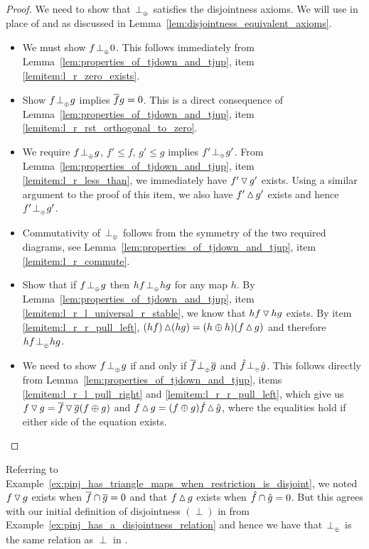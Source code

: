 \begin{proof}
  We need to show that ${}_{{}_{}}{\perp_{{}_{\oplus}}}$ satisfies the disjointness axioms. We will use  in
  place of  and  as discussed in
  Lemma~\ref{lem:disjointness_equivalent_axioms}.
  \begin{itemize}
    \item[\axiom{Dis}{1}] We must show $f {}_{{}_{}}{\perp_{{}_{\oplus}}} 0$. This follows immediately from
      Lemma~\ref{lem:properties_of_tjdown_and_tjup}, item \ref{lemitem:l_r_zero_exists}.
    \item[\axiom{Dis}{2}] Show $f {}_{{}_{}}{\perp_{{}_{\oplus}}} g$ implies $\overline{f}g = 0$. This is a direct consequence of
      Lemma~\ref{lem:properties_of_tjdown_and_tjup}, item
      \ref{lemitem:l_r_rst_orthogonal_to_zero}.
    \item[\axiom{Dis}{3}] We require $f{}_{{}_{}}{\perp_{{}_{\oplus}}} g$, $f' \le f$, $g' \le g$ implies $f' {}_{{}_{}}{\perp_{{}_{\oplus}}} g'$.
      From Lemma~\ref{lem:properties_of_tjdown_and_tjup}, item \ref{lemitem:l_r_less_than}, we
      immediately have $f' \operatorname{\triangledown} g'$ exists. Using a similar argument to the proof of this item,
      we also have $f' \operatorname{\vartriangle} g'$ exists and hence $f' {}_{{}_{}}{\perp_{{}_{\oplus}}} g'$.
    \item[\axiom{Dis}{4}] Commutativity of ${}_{{}_{}}{\perp_{{}_{\oplus}}}$ follows from the symmetry of the two required
    diagrams, see Lemma~\ref{lem:properties_of_tjdown_and_tjup}, item
      \ref{lemitem:l_r_commute}.
    \item[\axiom{Dis}{5}] Show that if $f{}_{{}_{}}{\perp_{{}_{\oplus}}} g$ then $h f {}_{{}_{}}{\perp_{{}_{\oplus}}} h g$ for any map $h$.
      By  Lemma~\ref{lem:properties_of_tjdown_and_tjup}, item
      \ref{lemitem:l_r_l_universal_r_stable}, we know that $h f \operatorname{\triangledown} h g$ exists.
      By item \ref{lemitem:l_r_r_pull_left},  $(h f)\operatorname{\vartriangle} (h g) = (h \oplus h) (f\operatorname{\vartriangle} g)$
      and therefore $h f {}_{{}_{}}{\perp_{{}_{\oplus}}} h g$.
    \item[\axiom{Dis}{6'}] We need to show $f{}_{{}_{}}{\perp_{{}_{\oplus}}} g$ if and only if $\overline{f} {}_{{}_{}}{\perp_{{}_{\oplus}}} \overline{g}$ and
      $\hat{f}{}_{{}_{}}{\perp_{{}_{\oplus}}} \hat{g}$. This follows directly from
      Lemma~\ref{lem:properties_of_tjdown_and_tjup}, items
      \ref{lemitem:l_r_l_pull_right} and       \ref{lemitem:l_r_r_pull_left}, which give us
      $f\operatorname{\triangledown} g = \overline{f}\operatorname{\triangledown} \overline{g} (f\oplus g)$ and
      $f\operatorname{\vartriangle} g = (f \oplus g)\hat{f}\operatorname{\vartriangle} \hat{g}$, where the equalities hold if either side of
      the equation exists.
  \end{itemize}
\end{proof}

\begin{example}\label{ex:tensor_perp_in_pinj}
  Referring to Example~\ref{ex:pinj_has_triangle_maps_when_restriction_is_disjoint}, we noted
  $f\operatorname{\triangledown} g$ exists when $\overline{f} \cap \overline{g} = 0$ and that $f \operatorname{\vartriangle} g$ exists when $\hat{f} \cap
  \hat{g} = 0$. But this agrees with our initial definition of disjointness $(\perp)$ in \pinj from
  Example~\ref{ex:pinj_has_a_disjointness_relation} and hence we have that ${}_{{}_{}}{\perp_{{}_{\oplus}}}$ is the same
  relation as $\perp$ in \pinj.
\end{example}

